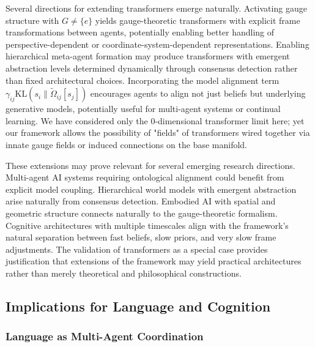 \documentclass[11pt]{article}
\begin{document}
Several directions for extending transformers emerge naturally. Activating gauge structure with $G \neq \{e\}$ yields gauge-theoretic transformers with explicit frame transformations between agents, potentially enabling better handling of perspective-dependent or coordinate-system-dependent representations.  Enabling hierarchical meta-agent formation may produce transformers with emergent abstraction levels determined dynamically through consensus detection rather than fixed architectural choices. Incorporating the model alignment term $\gamma_{ij} \mathrm{KL}(s_i \| \tilde{\Omega}_{ij}[s_j])$ encourages agents to align not just beliefs but underlying generative models, potentially useful for multi-agent systems or continual learning. We have considered only the 0-dimensional transformer limit here; yet our framework allows the possibility of "fields" of transformers wired together via innate gauge fields or induced connections on the base manifold.

These extensions may prove relevant for several emerging research directions. Multi-agent AI systems requiring ontological alignment could benefit from explicit model coupling. Hierarchical world models with emergent abstraction arise naturally from consensus detection. Embodied AI with spatial and geometric structure connects naturally to the gauge-theoretic formalism. Cognitive architectures with multiple timescales align with the framework's natural separation between fast beliefs, slow priors, and very slow frame adjustments. The validation of transformers as a special case provides justification that extensions of the framework may yield practical architectures rather than merely theoretical and philosophical constructions.

\subsection{Implications for Language and Cognition}

\subsubsection{Language as Multi-Agent Coordination}
\end{document}
